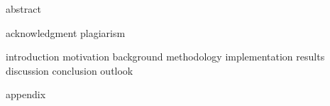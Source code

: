 \documentclass[paper=a4,twoside=true,fontsize=11pt,numbers=noendperiod,chapterprefix=false]{scrbook}
\begin{document}
{abstract}

\cleardoublepage

\cleardoublepage

{acknowledgment}
{plagiarism}

\tableofcontents
\cleardoublepage

\listoffigures
{}
\cleardoublepage

\listoftables
{}
\cleardoublepage

\renewcommand*{\chapterpagestyle}{mychapterpagestyle}
\renewcommand*{\chapterformat}{} %

{introduction}
{motivation}
{background}
{methodology}
{implementation}
{results}
{discussion}
{conclusion}
{outlook}


\appendix
\clearpage
\renewcommand*{\chapterpagestyle}{myappendixpagestyle}
{appendix}

\clearpage
\renewcommand*{\chapterpagestyle}{empty}
\nocite{*}
% 

\end{document}
